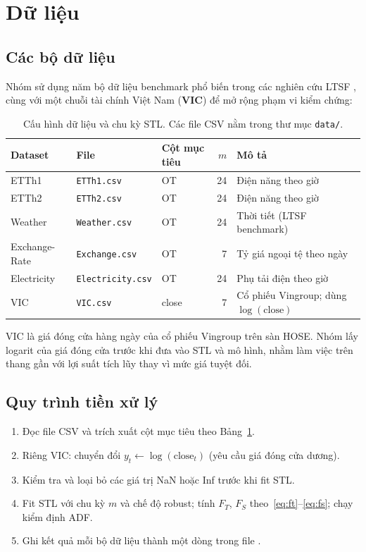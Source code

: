 \section{Dữ liệu}
\label{sec:data}

\subsection{Các bộ dữ liệu}

Nhóm sử dụng năm bộ dữ liệu benchmark phổ biến trong các nghiên cứu LTSF
\cite{zeng2023ltsf}, cùng với một chuỗi tài chính Việt Nam (\textbf{VIC})
để mở rộng phạm vi kiểm chứng:

\begin{table}[H]
  \centering
  \caption{Cấu hình dữ liệu và chu kỳ STL. Các file CSV nằm trong thư mục \texttt{data/}.}
  \label{tab:datasets}
  \small
  \begin{tabular}{@{}lllrl@{}}
    \toprule
    Dataset & File & Cột mục tiêu & \(m\) & Mô tả \\
    \midrule
    ETTh1         & \texttt{ETTh1.csv}       & OT    & 24 & Điện năng theo giờ \\
    ETTh2         & \texttt{ETTh2.csv}       & OT    & 24 & Điện năng theo giờ \\
    Weather       & \texttt{Weather.csv}     & OT    & 24 & Thời tiết (LTSF benchmark) \\
    Exchange-Rate & \texttt{Exchange.csv}    & OT    & 7  & Tỷ giá ngoại tệ theo ngày \\
    Electricity   & \texttt{Electricity.csv} & OT    & 24 & Phụ tải điện theo giờ \\
    VIC           & \texttt{VIC.csv}         & close & 7  & Cổ phiếu Vingroup; dùng \(\log(\mathrm{close})\) \\
    \bottomrule
  \end{tabular}
\end{table}

VIC là giá đóng cửa hàng ngày của cổ phiếu Vingroup trên sàn HOSE.
Nhóm lấy logarit của giá đóng cửa trước khi đưa vào STL và mô hình,
nhằm làm việc trên thang gần với lợi suất tích lũy thay vì mức giá tuyệt đối.

\subsection{Quy trình tiền xử lý}

\begin{enumerate}
  \item Đọc file CSV và trích xuất cột mục tiêu theo Bảng~\ref{tab:datasets}.
  \item Riêng VIC: chuyển đổi \(y_t \leftarrow \log(\mathrm{close}_t)\)
        (yêu cầu giá đóng cửa dương).
  \item Kiểm tra và loại bỏ các giá trị NaN hoặc Inf trước khi fit STL.
  \item Fit STL với chu kỳ \(m\) và chế độ robust; tính \(F_T\), \(F_S\)
        theo~\eqref{eq:ft}--\eqref{eq:fs}; chạy kiểm định ADF.
  \item Ghi kết quả mỗi bộ dữ liệu thành một dòng trong file
        .
\end{enumerate}

